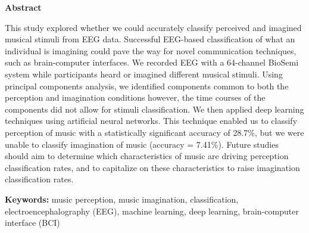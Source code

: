 \begin{preliminary}
\newpage
{}
\Large\begin{center}\textbf{Abstract}\end{center}\normalsize
\begin{spacing}{2}
This study explored whether we could accurately classify perceived and imagined musical stimuli from EEG data. 
Successful EEG-based classification of what an individual is imagining could pave the way for novel communication techniques, such as brain-computer interfaces. 
We recorded EEG with a 64-channel BioSemi system while participants heard or imagined different musical stimuli. 
Using principal components analysis, we identified components common to both the perception and imagination conditions however, the time courses of the components did not allow for stimuli classification. 
We then applied deep learning techniques using artificial neural networks. 
This technique enabled us to classify perception of music with a statistically significant accuracy of 28.7\%, but we were unable to classify imagination of music (accuracy = 7.41\%). 
Future studies should aim to determine which characteristics of music are driving perception classification rates, and to capitalize on these characteristics to raise imagination classification rates. 
\end{spacing}
\vfill
\textbf{Keywords:} music perception, music imagination, classification, electroencephalography (EEG), machine learning, deep learning, brain-computer interface (BCI)
\newpage
{}
\acknowledge{\makeacknowledge}	%
\newpage
\tableofcontents
\newpage
{}
\listoftables
\newpage
{}
\listoffigures
\newpage
{}
\listofmyappendices\newpage
\cleardoublepage
\end{preliminary}
